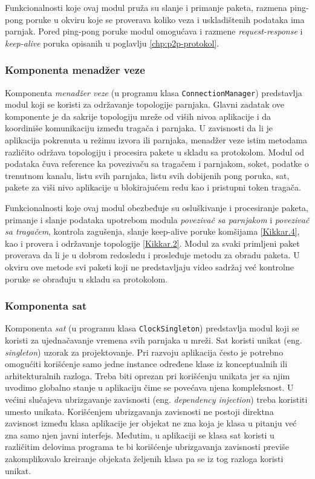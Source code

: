 \documentclass[12pt,oneside]{memoir}
\begin{document}
Funkcionalnosti koje ovaj modul pruža su slanje i primanje paketa, razmena ping-pong poruke u okviru koje se proverava koliko veza i uskladištenih podataka ima parnjak. Pored ping-pong poruke modul omogućava i razmene \textit{request-response} i \textit{keep-alive} poruka opisanih u poglavlju \ref{chp:p2p-protokol}. 
			

\subsubsection{Komponenta menadžer veze}
\label{implementacija.2.3.3}

Komponenta \textit{menadžer veze} (u programu klasa \texttt{ConnectionManager}) predstavlja modul koji se koristi za održavanje topologije parnjaka. Glavni zadatak ove komponente je da sakrije topologiju mreže od viših nivoa aplikacije i da koordiniše komunikaciju između tragača i parnjaka. U zavisnosti da li je aplikacija pokrenuta u režimu izvora ili parnjaka, menadžer veze istim metodama različito održava topologiju i procesira pakete u skladu sa protokolom. Modul od podataka čuva reference ka povezivaču sa tragačem i parnjakom, soket, podatke o trenutnom kanalu, listu svih parnjaka, listu svih dobijenih pong poruka, sat, pakete za viši nivo aplikacije u blokirajućem redu kao i pristupni token tragača.

Funkcionalnosti koje ovaj modul obezbeđuje su osluškivanje i procesiranje paketa, primanje i slanje podataka upotrebom modula \textit{povezivač sa parnjakom} i \textit{povezivač sa tragačem}, kontrola zagušenja, slanje keep-alive poruke komšijama \ref{Kikkar.4}, kao i provera i održavanje topologije \ref{Kikkar.2}. Modul za svaki primljeni paket proverava da li je u dobrom redosledu i prosleđuje metodu za obradu paketa. U okviru ove metode svi paketi koji ne predstavljaju video sadržaj već kontrolne poruke se obrađuju u skladu sa protokolom. 


\subsubsection{Komponenta sat}
\label{implementacija.2.3.4}

Komponenta \textit{sat} (u programu klasa \texttt{ClockSingleton}) predstavlja modul koji se koristi za ujednačavanje vremena svih parnjaka u mreži. Sat koristi unikat (eng. \textit{singleton}) uzorak za projektovanje. Pri razvoju aplikacija često je potrebno omogućiti korišćenje samo jedne instance određene klase iz konceptualnih ili arhitekturalnih razloga. Treba biti oprezan pri korišćenju unikata jer sa njim uvodimo globalno stanje u aplikaciju čime se povećava njena kompleksnost. U većini slučajeva ubrizgavanje zavisnosti (eng. \textit{dependency injection}) treba koristiti umesto unikata. Korišćenjem ubrizgavanja zavisnosti ne postoji direktna zavisnost između klasa aplikacije jer objekat ne zna koja je klasa u pitanju već zna samo njen javni interfejs. Međutim, u aplikaciji se klasa sat koristi u različitim delovima programa te bi korišćenje ubrizgavanja zavisnosti previše zakomplikovalo kreiranje objekata željenih klasa pa se iz tog razloga koristi unikat.
\end{document}
